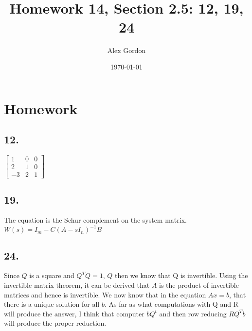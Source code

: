 \documentclass[12]{scrartcl}
\begin{document}
\title{Homework 14, Section 2.5: 12, 19, 24}
\author{Alex Gordon}
\date{\today}
\maketitle
\section*{Homework}
\subsection*{12.}
$ \begin{bmatrix} 1&0&0 \\ 2&1&0 \\ -3&2&1 \end{bmatrix}$
\subsection*{19.}
The equation is the Schur complement on the system matrix. $W(s) = I_m - C(A - sI_n)^{-1}B$
\subsection*{24.}
Since $Q$ is a square and  $Q^T Q = 1$, $Q$ then we know that Q is invertible. Using the invertible matrix theorem, it can be derived that $A$ is the product of invertible matrices and hence is invertible. We now know that in the equation $Ax = b$, that there is a unique solution for all $b$. As far as what computations with Q and R will produce the answer, I think that computer $bQ^t$ and then row reducing $RQ^Tb$ will produce the proper reduction. 
\end{document}
